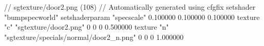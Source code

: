 // sgtexture/door2.png (108)
// Automatically generated using cfgfix
setshader "bumpspecworld"
setshaderparam "specscale" 0.100000 0.100000 0.100000
texture "c" "sgtexture/door2.png" 0 0 0 0.500000
texture "n" "sgtexture/specials/normal/door2_n.png" 0 0 0 1.000000
